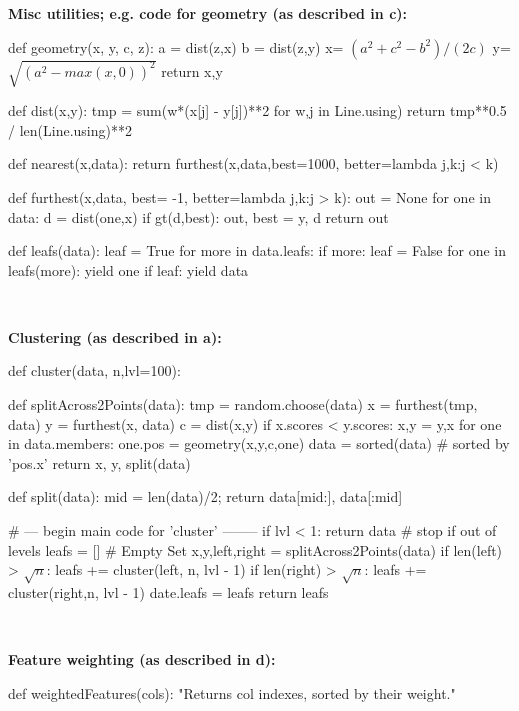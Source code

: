 \begin{figure*}
\begin{minipage}[t]{.45\linewidth}
{\bf Misc utilities; e.g. code for geometry (as described in c):}

 
\begin{python}[left]
def geometry(x, y, c, z): 
  a = dist(z,x)
  b = dist(z,y) 
  x= $(a^2 + c^2 - b^2)/(2c)$ 
  y=  $\sqrt{(a^2 - max(x,0))^2}$
  return x,y

def dist(x,y):
   tmp = sum(w*(x[j] - y[j])**2 for w,j in Line.using) 
   return tmp**0.5 / len(Line.using)**2
   
def nearest(x,data):
  return furthest(x,data,best=1000,
                    better=lambda j,k:j < k)
 
def furthest(x,data, best= -1, 
                     better=lambda j,k:j > k):  
  out = None
  for one in data:
    d = dist(one,x)
    if gt(d,best): out, best = y, d
  return out

def leafs(data):
  leaf = True
  for more in data.leafs:
    if more:
       leaf = False
       for one in leafs(more):
         yield one
  if leaf: 
    yield data
\end{python}
 \end{minipage}~~~~~~~~~\begin{minipage}[t]{.45\linewidth} 
\scriptsize\vspace{1mm}
{\bf Clustering (as described in a):}
\begin{python}[right]
def cluster(data, n,lvl=100):

  def splitAcross2Points(data): 
    tmp = random.choose(data)
    x = furthest(tmp, data)
    y = furthest(x, data) 
    c = dist(x,y)  
    if x.scores < y.scores:
      x,y = y,x 
    for one in data.members: 
      one.pos = geometry(x,y,c,one)
    data = sorted(data) # sorted by 'pos.x'
    return x, y, split(data)
  
  def split(data):   
    mid = len(data)/2; 
    return data[mid:], data[:mid]
    
  # --- begin main code for  'cluster' --------
  if lvl < 1: 
     return data # stop if out of levels
  leafs = [] # Empty Set
  x,y,left,right = splitAcross2Points(data) 
  if len(left) > $\sqrt{n}$:  
     leafs += cluster(left, n, lvl - 1)  
  if len(right) > $\sqrt{n}$:  
     leafs += cluster(right,n,  lvl - 1) 
  date.leafs = leafs
  return leafs
\end{python} 

~~

{\bf Feature weighting  (as described in d):}

\begin{python}[right]
def weightedFeatures(cols):
  "Returns col indexes, sorted by their weight."
  

\end{python}
\end{minipage}
\end{figure*}
